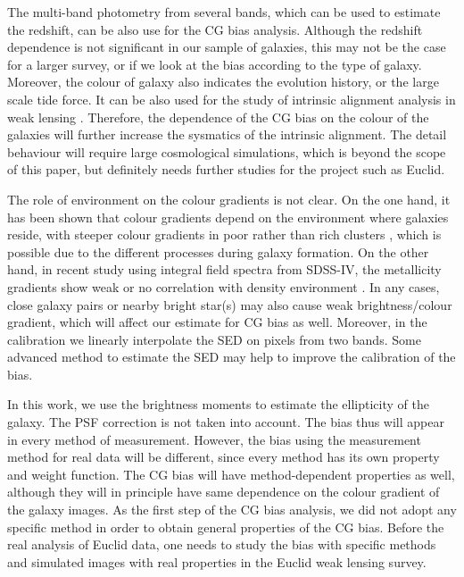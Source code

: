 \documentclass[useAMS,usenatbib]{mn2e}
\begin{document}
The multi-band photometry from several bands, which can be used to
estimate the redshift, can be also use for the CG bias analysis.
Although the redshift dependence is not significant in our sample of
galaxies, this may not be the case for a larger survey, or if we look
at the bias according to the type of galaxy. Moreover, the colour of
galaxy also indicates the evolution history, or the large scale tide
force.  It can be also used for the study of intrinsic alignment
analysis in weak lensing \citep[e.g.][]{2015SSRv..193....1J}.
Therefore, the dependence of the CG bias on the colour of the galaxies
will further increase the sysmatics of the intrinsic alignment. The
detail behaviour will require large cosmological simulations, which is
beyond the scope of this paper, but definitely needs further studies for
the project such as Euclid.

The role of environment on the colour gradients is not clear. On the
one hand, it has been shown that colour gradients depend on the
environment where galaxies reside, with steeper colour gradients in
poor rather than rich clusters \citep[e.g.][]{2005ApJ...626L..19L},
which is possible due to the different processes during galaxy
formation. On the other hand, in recent study using integral field
spectra from SDSS-IV, the metallicity gradients show weak or no
correlation with density environment \citep{2017MNRAS.465.4572Z}. In
any cases, close galaxy pairs or nearby bright star(s) may also cause
weak brightness/colour gradient, which will affect our estimate for CG
bias as well. Moreover, in the calibration we linearly interpolate the
SED on pixels from two bands. Some advanced method to estimate the SED
\citep[e.g.][]{2016A&A...589A...2J} may help to improve the
calibration of the bias.

In this work, we use the brightness moments to estimate the
ellipticity of the galaxy. The PSF correction is not taken into
account. The bias thus will appear in every method of measurement.
However, the bias using the measurement method for real data
will be different, since every method has its own property and weight
function. The CG bias will have method-dependent properties as well,
although they will in principle have same dependence on the colour
gradient of the galaxy images. As the first step of the CG bias
analysis, we did not adopt any specific method in order to obtain
general properties of the CG bias. Before the real analysis of Euclid
data, one needs to study the bias with specific methods and simulated
images with real properties in the Euclid weak lensing survey.
\end{document}
